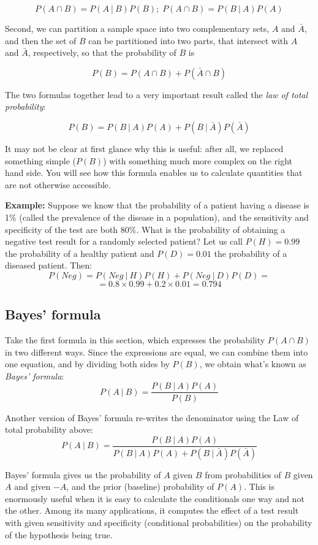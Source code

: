 \documentclass[
  letterpaper,
  DIV=11,
  numbers=noendperiod]{scrreprt}
\begin{document}
\[P(A \cap B) = P(A \ \vert \ B) P(B); \;  P(A \cap B) = P(B \ \vert \ A) P(A) \]

Second, we can partition a sample space into two complementary sets,
\(A\) and \(\bar A\), and then the set of \(B\) can be partitioned into
two parts, that intersect with \(A\) and \(\bar A\), respectively, so
that the probability of \(B\) is

\[P(B) = P(A \cap B) + P( \bar A\cap B)\]

The two formulas together lead to a very important result called the
\emph{law of total probability}:

\[
P(B) =  P(B \ \vert \ A) P(A) + P(B \ \vert \ \bar A)P(\bar A)
\]

It may not be clear at first glance why this is useful: after all, we
replaced something simple (\(P(B)\)) with something much more complex on
the right hand side. You will see how this formula enables us to
calculate quantities that are not otherwise accessible.

\textbf{Example:} Suppose we know that the probability of a patient
having a disease is 1\% (called the prevalence of the disease in a
population), and the sensitivity and specificity of the test are both
80\%. What is the probability of obtaining a negative test result for a
randomly selected patient? Let us call \(P(H) = 0.99\) the probability
of a healthy patient and \(P(D) = 0.01\) the probability of a diseased
patient. Then:
\[ P(Neg) =  P(Neg  \ \vert \  H) P(H) + P(Neg  \ \vert \  D)P(D)  = \]
\[ = 0.8 \times 0.99 + 0.2 \times 0.01 = 0.794\]

\subsection{Bayes' formula}\label{bayes-formula}

Take the first formula in this section, which expresses the probability
\(P(A \cap B)\) in two different ways. Since the expressions are equal,
we can combine them into one equation, and by dividing both sides by
\(P(B)\), we obtain what's known as \emph{Bayes' formula}:
\[ P(A \ \vert \ B) = \frac{P(B \ \vert \ A) P(A)}{P(B) }\]

Another version of Bayes' formula re-writes the denominator using the
Law of total probability above: \[
P(A \ \vert \ B) = \frac{P(B \ \vert \ A)P(A)}{P(B \ \vert \ A) P(A) + P(B \ \vert \ \bar A)P( \bar A)}
\]

Bayes' formula gives us the probability of \(A\) given \(B\) from
probabilities of \(B\) given \(A\) and given \(-A\), and the prior
(baseline) probability of \(P(A)\). This is enormously useful when it is
easy to calculate the conditionals one way and not the other. Among its
many applications, it computes the effect of a test result with given
sensitivity and specificity (conditional probabilities) on the
probability of the hypothesis being true.
\end{document}
